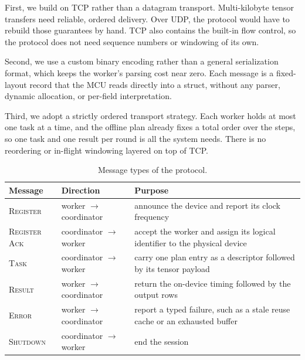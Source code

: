 First, we build on TCP rather than a datagram transport.
Multi-kilobyte tensor transfers need reliable, ordered delivery. Over UDP, the protocol would have to rebuild those guarantees by hand.
TCP also contains the built-in flow control, so the protocol does not need sequence numbers or windowing of its own.

Second, we use a custom binary encoding rather than a general serialization format, which keeps the worker's parsing cost near zero.
Each message is a fixed-layout record that the MCU reads directly into a struct, without any parser, dynamic allocation, or per-field interpretation.

Third, we adopt a strictly ordered transport strategy. Each worker holds at most
one task at a time, and the offline plan already fixes a total order over the
steps, so one task and one result per round is all the system
needs. There is no reordering or in-flight windowing layered on top of TCP.

\begin{table}[t]
\centering
\caption{Message types of the protocol.}
\label{tab:message-type}
\footnotesize
\setlength{\tabcolsep}{4pt}
\begin{tabular}{l l p{6.2cm}}
\hline
\textbf{Message} & \textbf{Direction} & \textbf{Purpose} \\
\hline
\textsc{Register} & worker $\rightarrow$ coordinator &
announce the device and report its clock frequency \\
\textsc{Register Ack} & coordinator $\rightarrow$ worker &
accept the worker and assign its logical identifier to the physical device \\
\textsc{Task} & coordinator $\rightarrow$ worker &
carry one plan entry as a descriptor followed by its tensor payload \\
\textsc{Result} & worker $\rightarrow$ coordinator &
return the on-device timing followed by the output rows \\
\textsc{Error} & worker $\rightarrow$ coordinator &
report a typed failure, such as a stale reuse cache or an exhausted buffer \\
\textsc{Shutdown} & coordinator $\rightarrow$ worker &
end the session \\
\hline
\end{tabular}
\end{table}


